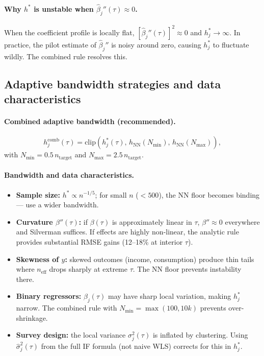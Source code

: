 \documentclass[12pt,a4paper]{article}
\theoremstyle{definition}
\begin{document}
\paragraph{Why $h^*$ is unstable when $\hat\beta_j''(\tau)\approx 0$.}
When the coefficient profile is locally flat, $[\hat\beta_j''(\tau)]^2
\approx 0$ and $h_j^*\to\infty$. In practice, the pilot estimate of
$\hat\beta_j''$ is noisy around zero, causing $h_j^*$ to fluctuate
wildly. The combined rule resolves this.

\subsection{Adaptive bandwidth strategies and data characteristics}

\paragraph{Combined adaptive bandwidth (recommended).}
\begin{equation}
  h_j^{\mathrm{comb}}(\tau)
  = \mathrm{clip}\!\left(h_j^*(\tau),\,
    h_{\mathrm{NN}}(N_{\min}),\,h_{\mathrm{NN}}(N_{\max})\right),
  \label{eq:hcomb}
\end{equation}
with $N_{\min}=0.5\,n_{\mathrm{target}}$ and
$N_{\max}=2.5\,n_{\mathrm{target}}$.

\paragraph{Bandwidth and data characteristics.}

\begin{itemize}
\item \textbf{Sample size:} $h^*\propto n^{-1/5}$; for small $n$
($<500$), the NN floor becomes binding — use a wider bandwidth.

\item \textbf{Curvature $\beta''(\tau)$:} if $\beta(\tau)$ is
approximately linear in $\tau$, $\beta''\approx 0$ everywhere and
Silverman suffices. If effects are highly non-linear, the analytic
rule provides substantial RMSE gains (12--18\% at interior $\tau$).

\item \textbf{Skewness of $y$:} skewed outcomes (income, consumption)
produce thin tails where $n_{\mathrm{eff}}$ drops sharply at extreme
$\tau$. The NN floor prevents instability there.

\item \textbf{Binary regressors:} $\beta_j(\tau)$ may have sharp local
variation, making $h_j^*$ narrow. The combined rule with
$N_{\min}=\max(100,10k)$ prevents over-shrinkage.

\item \textbf{Survey design:} the local variance $\sigma_j^2(\tau)$
is inflated by clustering. Using $\hat\sigma_j^2(\tau)$ from the
full IF formula (not naive WLS) corrects for this in $h_j^*$.
\end{itemize}
\end{document}

